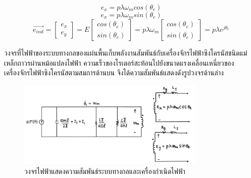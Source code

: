 \documentclass[11pt,a4paper]{article}
\begin{document}
\begin{equation}
    e_{x} = p \lambda \omega_{m} cos(\theta_{e})
\end{equation}
\begin{equation}
    e_{x} = p \lambda \omega_{m} sin(\theta_{e})
\end{equation}
\begin{equation}
    \vec{e_{ind}} =
    \begin{bmatrix}
        e_{x} \\ e_{y}
    \end{bmatrix} = E
    \begin{bmatrix}
        cos(\theta_{e}) \\ sin(\theta_{e})
    \end{bmatrix} = p \lambda \omega_{m}
    \begin{bmatrix}
        cos(\theta_{e}) \\ sin(\theta_{e})
    \end{bmatrix} =
    p \lambda e^{j\theta_{e}}
\end{equation}

วงจรที่ไฟฟ้าของระบบทางกลของแผ่นพื้นเก็บพลังงานสัมพันธ์กับเครื่องจักรไฟฟ้าซิงโครนัสชนิดแม่เหล็กถาวรผ่านหม้อแปลงไฟฟ้า ความเร็วของโรเตอร์สะท้อนไปยังขนาดแรงเคลื่อนเหนี่ยวของเครื่องจักรไฟฟ้าซิงโครนัสตามสมการด้านบน จึงได้ความสัมพันธ์แสดงดังรูปวงจรด้านล่าง
\begin{figure}[H]
    \begin{center}
        \includegraphics[width=0.8\textwidth]{cir_mech_elec_1n.jpg}
    \end{center}
    \caption{วงจรไฟฟ้าแสดงความสัมพันธ์ระบบทางกลและเครื่องกำเนิดไฟฟ้า}
    \label{cir_mech_elec_1n}
\end{figure}
\end{document}
